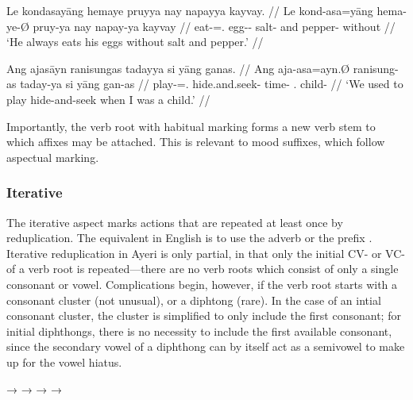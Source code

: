 \pex
\a\label{ex:habcns}\begingl
	\gla Le kondasayāng hemaye pruyya nay napayya kayvay. //
	\glb Le kond-asa=yāng hema-ye-Ø pruy-ya nay napay-ya kayvay //
	\glc \PatTI{} eat-\Hab{}=\TsgM{}.\Aarg{} egg-\Pl{}-\Top{} salt-\Loc{} 
		and pepper-\Loc{} without //
	\glft `He always eats his eggs without salt and pepper.' //
\endgl

\a\label{ex:habvwl}\begingl
	\gla Ang ajasāyn ranisungas tadayya si yāng ganas. //
	\glb Ang aja-asa=ayn.Ø ranisung-as taday-ya si yāng gan-as //
	\glc \AgtT{} play-\Hab{}=\Fpl{}.\Top{} hide.and.seek-\Parg{} 
		time-\Loc{} \Rel{} \Fsg{}.\Aarg{} child-\Parg{} //
	\glft `We used to play hide-and-seek when I was a child.' //
\endgl

\xe

Importantly, the verb root with habitual marking forms a new verb stem to which 
affixes may be attached. This is relevant to mood suffixes, which follow 
aspectual marking.



\subsubsection{Iterative}

The iterative aspect marks actions that are repeated at least once by 
reduplication. The equivalent in English is to use the adverb  or the 
prefix . Iterative reduplication in Ayeri is only partial, in that only 
the initial CV- or VC- of a verb root is repeated---there are no verb roots 
which consist of only a single consonant or vowel. Complications begin, 
however, if the verb root starts with a consonant cluster (not unusual), or a 
diphtong (rare). In the case of an intial consonant cluster, the cluster is 
simplified to only include the first consonant; for initial diphthongs, there 
is no necessity to include the first available consonant, since the secondary 
vowel of a diphthong can by itself act as a semivowel to make up for the vowel 
hiatus.

\pex
	\a {}
		→ 
	\a {}
		→ 
	\a {}
		→ 
	\a {}
		→ 
\xe

